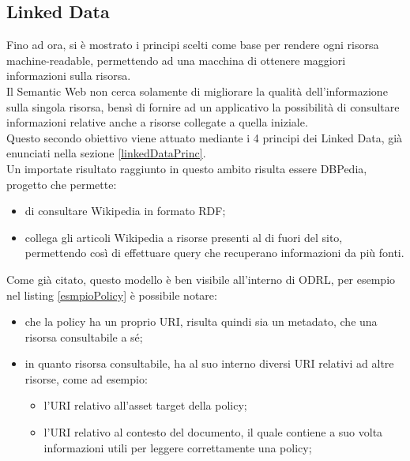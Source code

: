 \documentclass[12pt,a4paper,twoside]{book}
\begin{document}
\subsection{Linked Data}
Fino ad ora, si è mostrato i principi scelti come base per rendere ogni risorsa machine-readable, permettendo ad una macchina di ottenere maggiori informazioni sulla risorsa.\\
Il Semantic Web non cerca solamente di migliorare la qualità dell'informazione sulla singola risorsa, bensì di fornire ad un applicativo la possibilità di consultare informazioni relative anche a risorse collegate a quella iniziale.\\
Questo secondo obiettivo viene attuato mediante i 4 principi dei Linked Data, già enunciati nella sezione \ref{linkedDataPrinc}.\\
Un importate risultato raggiunto in questo ambito risulta essere DBPedia\cite{dbpedia}, progetto che permette:
\begin{itemize}
	\item di consultare Wikipedia in formato RDF;
	\item collega gli articoli Wikipedia a risorse presenti al di fuori del sito, permettendo così di effettuare query che recuperano informazioni da più fonti. 
\end{itemize}
Come già citato, questo modello è ben visibile all'interno di ODRL, per esempio nel listing \ref{esmpioPolicy} è possibile notare:
\begin{itemize}
	\item che la policy ha un proprio URI, risulta quindi sia un metadato, che una risorsa consultabile a sé;
	\item in quanto risorsa consultabile, ha al suo interno diversi URI relativi ad altre risorse, come ad esempio:
	\begin{itemize}
		\item l'URI relativo all'asset target della policy;
		\item l'URI relativo al contesto del documento, il quale contiene a suo volta informazioni utili per leggere correttamente una policy;
	\end{itemize}
\end{itemize}
\end{document}
